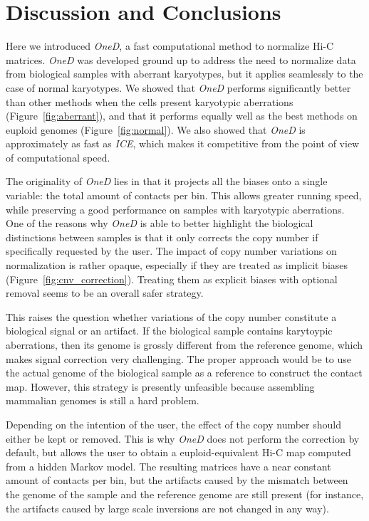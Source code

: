 \documentclass{article}
\begin{document}

\section{Discussion and Conclusions}

Here we introduced \textit{OneD}, a fast computational method to normalize
Hi-C matrices. \textit{OneD} was developed ground up to address the need
to normalize data from biological samples with aberrant karyotypes, but it
applies seamlessly to the case of normal karyotypes. We showed that
\textit{OneD} performs significantly better than other methods when the
cells present karyotypic aberrations (Figure~\ref{fig:aberrant}), and that
it performs equally well as the best methods on euploid genomes
(Figure~\ref{fig:normal}). We also showed that \textit{OneD} is
approximately as fast as \textit{ICE}, which makes it competitive from the
point of view of computational speed.

The originality of \textit{OneD} lies in that it projects all the biases
onto a single variable: the total amount of contacts per bin. This allows
greater running speed, while preserving a good performance on samples with
karyotypic aberrations. One of the reasons why \textit{OneD} is able to
better highlight the biological distinctions between samples is that it
only corrects the copy number if specifically requested by the user. The
impact of copy number variations on normalization is rather opaque,
especially if they are treated as implicit biases
(Figure~\ref{fig:cnv_correction}). Treating them as explicit biases with
optional removal seems to be an overall safer strategy.

This raises the question whether variations of the copy number constitute
a biological signal or an artifact. If the biological sample contains
karytoypic aberrations, then its genome is grossly different from the
reference genome, which makes signal correction very challenging. The
proper approach would be to use the actual genome of the biological sample
as a reference to construct the contact map. However, this strategy is
presently unfeasible because assembling mammalian genomes is still a hard
problem.

Depending on the intention of the user, the effect of the copy number
should either be kept or removed. This is why \textit{OneD} does not
perform the correction by default, but allows the user to obtain a
euploid-equivalent Hi-C map computed from a hidden Markov model. The
resulting matrices have a near constant amount of contacts per bin, but
the artifacts caused by the mismatch between the genome of the sample and
the reference genome are still present (for instance, the artifacts caused
by large scale inversions are not changed in any way).
\end{document}
